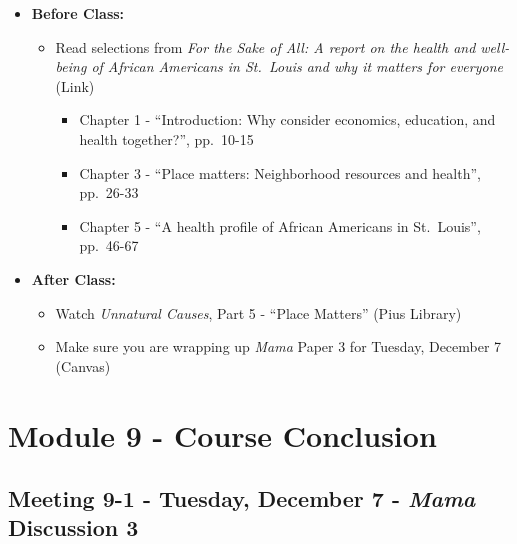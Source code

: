 \documentclass[
]{book}
\providecommand{\tightlist}{%
  \setlength{\itemsep}{0pt}\setlength{\parskip}{0pt}}
\begin{document}
\begin{itemize}
\tightlist
\item
  \textbf{Before Class:}

  \begin{itemize}
  \tightlist
  \item
    Read selections from \emph{For the Sake of All: A report on the health and well-being of African Americans in St.~Louis and why it matters for everyone} (Link)

    \begin{itemize}
    \tightlist
    \item
      Chapter 1 - ``Introduction: Why consider economics, education, and health together?'', pp.~10-15
    \item
      Chapter 3 - ``Place matters: Neighborhood resources and health'', pp.~26-33
    \item
      Chapter 5 - ``A health profile of African Americans in St.~Louis'', pp.~46-67
    \end{itemize}
  \end{itemize}
\item
  \textbf{After Class:}

  \begin{itemize}
  \tightlist
  \item
    Watch \emph{Unnatural Causes}, Part 5 - ``Place Matters'' (Pius Library)
  \item
    Make sure you are wrapping up \emph{Mama} Paper 3 for Tuesday, December 7 (Canvas)
  \end{itemize}
\end{itemize}

\newpage

\hypertarget{module-9---course-conclusion}{%
\section{Module 9 - Course Conclusion}\label{module-9---course-conclusion}}

\hypertarget{meeting-9-1---tuesday-december-7---mama-discussion-3}{%
\subsection*{\texorpdfstring{Meeting 9-1 - Tuesday, December 7 - \emph{Mama} Discussion 3}{Meeting 9-1 - Tuesday, December 7 - Mama Discussion 3}}\label{meeting-9-1---tuesday-december-7---mama-discussion-3}}
\end{document}

